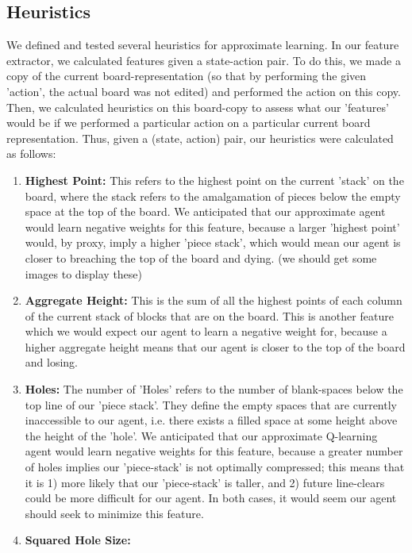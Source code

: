 \documentclass[11pt]{article}
\begin{document}
\subsection{Heuristics}
We defined and tested several heuristics for approximate learning. In our feature extractor, we calculated features given a state-action pair. To do this, we made a copy of the current board-representation (so that by performing the given 'action', the actual board was not edited) and performed the action on this copy. Then, we calculated heuristics on this board-copy to assess what our 'features' would be if we performed a particular action on a particular current board representation. Thus, given a (state, action) pair, our heuristics  were calculated as follows:
\begin{enumerate}
    \item \textbf{Highest Point:}
    This refers to the highest point on the current 'stack' on the board, where the stack refers to the amalgamation of pieces below the empty space at the top of the board. We anticipated that our approximate agent would learn negative weights for this feature, because a larger 'highest point' would, by proxy, imply a higher 'piece stack', which would mean our agent is closer to breaching the top of the board and dying. (we should get some images to display these)
    \item \textbf{Aggregate Height:}
    This is the sum of all the highest points of each column of the current stack of blocks that are on the board. This is another feature which we would expect our agent to learn a negative weight for, because a higher aggregate height means that our agent is closer to the top of the board and losing.
    \item \textbf{Holes:}
    The number of 'Holes' refers to the number of blank-spaces below the top line of our 'piece stack'. They define the empty spaces that are currently inaccessible to our agent, i.e. there exists a filled space at some height above the height of the 'hole'. We anticipated that our approximate Q-learning agent would learn negative weights for this feature, because a greater number of holes implies our 'piece-stack' is not optimally compressed; this means that it is 1) more likely that our 'piece-stack' is taller, and 2) future line-clears could be more difficult for our agent. In both cases, it would seem our agent should seek to minimize this feature.
    \item \textbf{Squared Hole Size:}

\end{enumerate}
\end{document}
